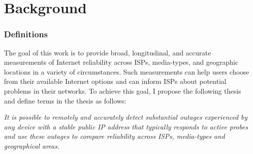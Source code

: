 
\chapter{Background}

\label{ch:related}



\subsection{Definitions}

The goal of this work is to provide broad, longitudinal, and accurate measurements of
Internet reliability across ISPs, media-types, and geographic
locations in a variety of circumstances. Such measurements can help
users choose from their available Internet options and can inform ISPs
about potential problems in their networks. To achieve this goal, I
propose the following thesis and define terms in the thesis as follows:

\emph{It is possible to remotely and accurately detect substantial outages
  experienced by any device with a stable public IP address that typically
  responds to active probes and use these outages to compare
  reliability across ISPs, media-types and geographical areas.}


